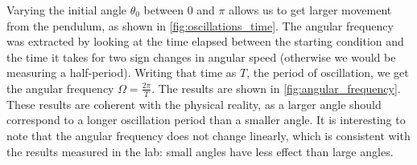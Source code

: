 Varying the initial angle \(\theta_0\) between \(0\) and \(\pi\) allows us to get larger movement from the pendulum, as shown in \autoref{fig:oscillations_time}. The angular frequency was extracted by looking at the time elapsed between the starting condition and the time it takes for two sign changes in angular speed (otherwise we would be measuring a half-period). Writing that time as \(T\), the period of oscillation, we get the angular frequency \(\Omega = \frac{2\pi}{T}\). The results are shown in \autoref{fig:angular_frequency}. These results are coherent with the physical reality, as a larger angle should correspond to a longer oscillation period than a smaller angle. It is interesting to note that the angular frequency does not change linearly, which is consistent with the results measured in the lab: small angles have less effect than large angles.

